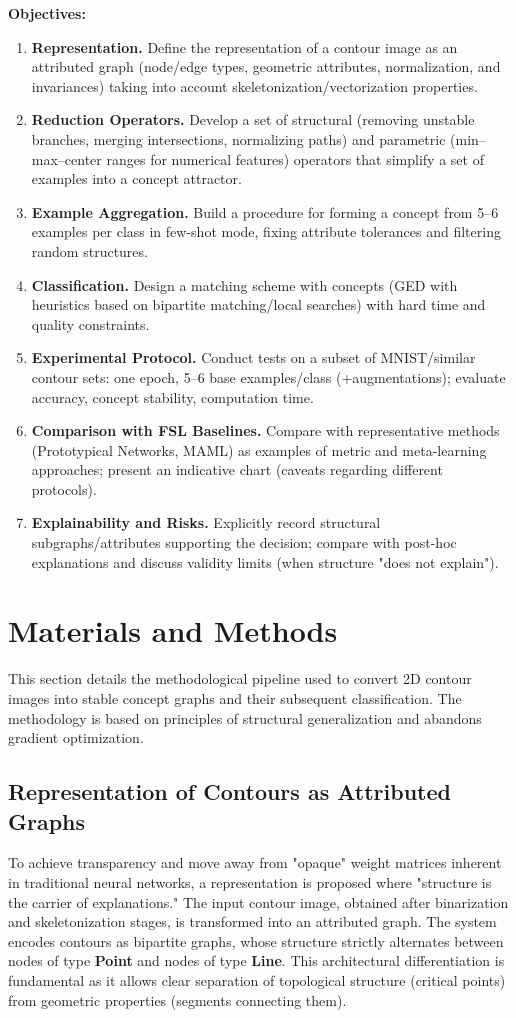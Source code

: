 \documentclass[conference]{IEEEtran}
\begin{document}
\textbf{Objectives:}
\begin{enumerate}
    \item \textbf{Representation.} Define the representation of a contour image as an attributed graph (node/edge types, geometric attributes, normalization, and invariances) taking into account skeletonization/vectorization properties.
    \item \textbf{Reduction Operators.} Develop a set of structural (removing unstable branches, merging intersections, normalizing paths) and parametric (min--max--center ranges for numerical features) operators that simplify a set of examples into a concept attractor.
    \item \textbf{Example Aggregation.} Build a procedure for forming a concept from 5--6 examples per class in few-shot mode, fixing attribute tolerances and filtering random structures.
    \item \textbf{Classification.} Design a matching scheme with concepts (GED with heuristics based on bipartite matching/local searches) with hard time and quality constraints.
    \item \textbf{Experimental Protocol.} Conduct tests on a subset of MNIST/similar contour sets: one epoch, 5--6 base examples/class (+augmentations); evaluate accuracy, concept stability, computation time.
    \item \textbf{Comparison with FSL Baselines.} Compare with representative methods (Prototypical Networks, MAML) as examples of metric and meta-learning approaches; present an indicative chart (caveats regarding different protocols).
    \item \textbf{Explainability and Risks.} Explicitly record structural subgraphs/attributes supporting the decision; compare with post-hoc explanations and discuss validity limits (when structure "does not explain").
\end{enumerate}

\section{Materials and Methods}
This section details the methodological pipeline used to convert 2D contour images into stable concept graphs and their subsequent classification. The methodology is based on principles of structural generalization and abandons gradient optimization.

\subsection{Representation of Contours as Attributed Graphs}
To achieve transparency and move away from "opaque" weight matrices inherent in traditional neural networks, a representation is proposed where "structure is the carrier of explanations." The input contour image, obtained after binarization and skeletonization stages, is transformed into an attributed graph. The system encodes contours as bipartite graphs, whose structure strictly alternates between nodes of type \textbf{Point} and nodes of type \textbf{Line}. This architectural differentiation is fundamental as it allows clear separation of topological structure (critical points) from geometric properties (segments connecting them).
\end{document}
